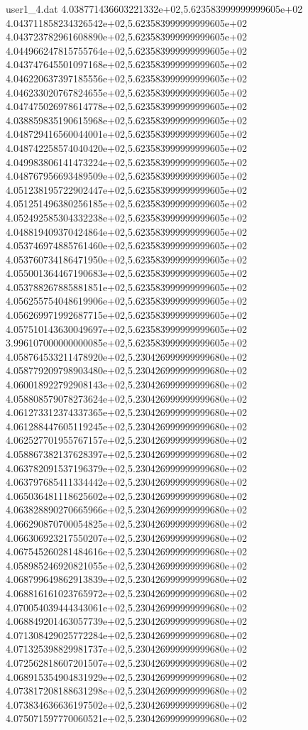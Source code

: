\begin{filecontents}{user1_4.dat}
4.038771436603221332e+02,5.623583999999999605e+02
4.043711858234326542e+02,5.623583999999999605e+02
4.043723782961608890e+02,5.623583999999999605e+02
4.044966247815755764e+02,5.623583999999999605e+02
4.043747645501097168e+02,5.623583999999999605e+02
4.046220637397185556e+02,5.623583999999999605e+02
4.046233020767824655e+02,5.623583999999999605e+02
4.047475026978614778e+02,5.623583999999999605e+02
4.038859835190615968e+02,5.623583999999999605e+02
4.048729416560044001e+02,5.623583999999999605e+02
4.048742258574040420e+02,5.623583999999999605e+02
4.049983806141473224e+02,5.623583999999999605e+02
4.048767956693489509e+02,5.623583999999999605e+02
4.051238195722902447e+02,5.623583999999999605e+02
4.051251496380256185e+02,5.623583999999999605e+02
4.052492585304332238e+02,5.623583999999999605e+02
4.048819409370424864e+02,5.623583999999999605e+02
4.053746974885761460e+02,5.623583999999999605e+02
4.053760734186471950e+02,5.623583999999999605e+02
4.055001364467190683e+02,5.623583999999999605e+02
4.053788267885881851e+02,5.623583999999999605e+02
4.056255754048619906e+02,5.623583999999999605e+02
4.056269971992687715e+02,5.623583999999999605e+02
4.057510143630049697e+02,5.623583999999999605e+02
3.996107000000000085e+02,5.623583999999999605e+02
4.058764533211478920e+02,5.230426999999999680e+02
4.058779209798903480e+02,5.230426999999999680e+02
4.060018922792908143e+02,5.230426999999999680e+02
4.058808579078273624e+02,5.230426999999999680e+02
4.061273312374337365e+02,5.230426999999999680e+02
4.061288447605119245e+02,5.230426999999999680e+02
4.062527701955767157e+02,5.230426999999999680e+02
4.058867382137628397e+02,5.230426999999999680e+02
4.063782091537196379e+02,5.230426999999999680e+02
4.063797685411334442e+02,5.230426999999999680e+02
4.065036481118625602e+02,5.230426999999999680e+02
4.063828890270665966e+02,5.230426999999999680e+02
4.066290870700054825e+02,5.230426999999999680e+02
4.066306923217550207e+02,5.230426999999999680e+02
4.067545260281484616e+02,5.230426999999999680e+02
4.058985246920821055e+02,5.230426999999999680e+02
4.068799649862913839e+02,5.230426999999999680e+02
4.068816161023765972e+02,5.230426999999999680e+02
4.070054039444343061e+02,5.230426999999999680e+02
4.068849201463057739e+02,5.230426999999999680e+02
4.071308429025772284e+02,5.230426999999999680e+02
4.071325398829981737e+02,5.230426999999999680e+02
4.072562818607201507e+02,5.230426999999999680e+02
4.068915354904831929e+02,5.230426999999999680e+02
4.073817208188631298e+02,5.230426999999999680e+02
4.073834636636197502e+02,5.230426999999999680e+02
4.075071597770060521e+02,5.230426999999999680e+02

\end{filecontents}
